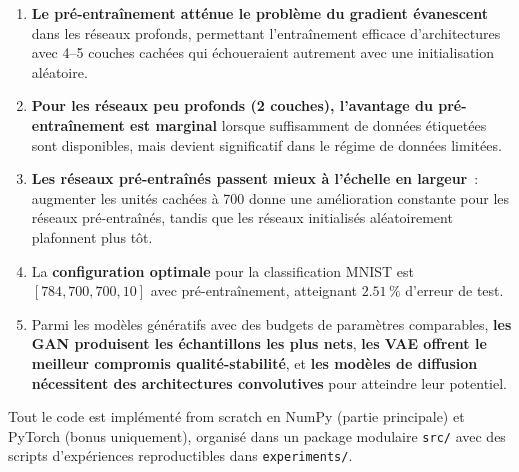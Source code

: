 \documentclass[11pt,a4paper]{article}
\begin{document}
\begin{enumerate}
    \item \textbf{Le pr\'e-entra\^inement att\'enue le probl\`eme du gradient \'evanescent}~\cite{erhan2010} dans les r\'eseaux profonds, permettant l'entra\^inement efficace d'architectures avec 4--5 couches cach\'ees qui \'echoueraient autrement avec une initialisation al\'eatoire.
    \item \textbf{Pour les r\'eseaux peu profonds (2 couches), l'avantage du pr\'e-entra\^inement est marginal} lorsque suffisamment de donn\'ees \'etiquet\'ees sont disponibles, mais devient significatif dans le r\'egime de donn\'ees limit\'ees.
    \item \textbf{Les r\'eseaux pr\'e-entra\^in\'es passent mieux \`a l'\'echelle en largeur}~: augmenter les unit\'es cach\'ees \`a 700 donne une am\'elioration constante pour les r\'eseaux pr\'e-entra\^in\'es, tandis que les r\'eseaux initialis\'es al\'eatoirement plafonnent plus t\^ot.
    \item La \textbf{configuration optimale} pour la classification MNIST est $[784, 700, 700, 10]$ avec pr\'e-entra\^inement, atteignant $2.51\,\%$ d'erreur de test.
    \item Parmi les mod\`eles g\'en\'eratifs avec des budgets de param\`etres comparables, \textbf{les GAN produisent les \'echantillons les plus nets}, \textbf{les VAE offrent le meilleur compromis qualit\'e-stabilit\'e}, et \textbf{les mod\`eles de diffusion n\'ecessitent des architectures convolutives} pour atteindre leur potentiel.
\end{enumerate}

Tout le code est impl\'ement\'e from scratch en NumPy (partie principale) et PyTorch (bonus uniquement), organis\'e dans un package modulaire \texttt{src/} avec des scripts d'exp\'eriences reproductibles dans \texttt{experiments/}.
\end{document}
